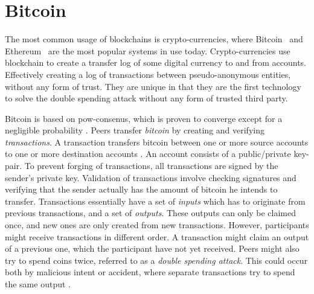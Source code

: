 \documentclass[USenglish]{uit-thesis}
\begin{document}
\section{Bitcoin}
The most common usage of blockchains is crypto-currencies, where Bitcoin~\cite{bitcoin} and Ethereum~\cite{ether} are the most popular systems in use today.
Crypto-currencies use blockchain to create a transfer log of some digital currency to and from accounts.
Effectively creating a log of transactions between pseudo-anonymous entities, without any form of trust.  
They are unique in that they are the first technology to solve the double spending attack without any form of trusted third party.

Bitcoin \cite{bitcoin} is based on \gls{pow}-consenus, which is proven to converge except for a negligible probability \cite{powbit}.  
Peers transfer \textit{bitcoin} by creating and verifying \textit{transactions}.
A transaction transfers bitcoin between one or more source accounts to one or more destination accounts \cite{propa}.
An account consists of a public/private key-pair.
To prevent forging of transactions, all transactions are signed by the sender's private key.
Validation of transactions involve checking signatures and verifying that the sender actually has the amount of bitcoin he intends to transfer.
Transactions essentially have a set of \textit{inputs} which has to originate from previous transactions, and a set of \textit{outputs}.
These outputs can only be claimed once, and new ones are only created from new transactions.
However, participants might receive transactions in different order.
A transaction might claim an output of a previous one, which the participant have not yet received.
Peers might also try to spend coins twice, referred to as a \textit{double spending attack}.
This could occur both by malicious intent or accident, where separate transactions try to spend the same output \cite{propa}.
\end{document}
